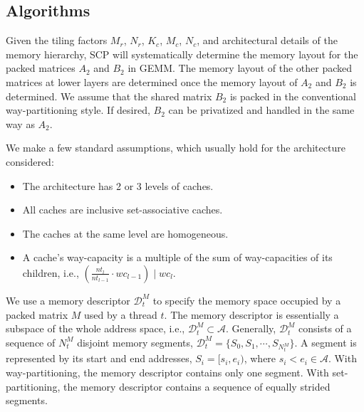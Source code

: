 \subsection{Algorithms}\label{subsec:formal}

Given the tiling factors $M_r$, $N_r$, $K_c$, $M_c$, $N_c$,
and architectural details of the memory hierarchy,
SCP will systematically determine 
the memory layout for the packed matrices $A_2$ and $B_2$ in GEMM.
The memory layout of the other packed matrices at
lower layers are determined once the memory layout of
$A_2$ and $B_2$ is determined.
We assume that the shared matrix $B_2$ is packed
in the conventional way-partitioning style.
If desired, $B_2$ can be privatized and handled in the same way as $A_2$.

We make a few standard assumptions, which usually
hold for the architecture considered:
\begin{itemize}
\item The architecture has 2 or 3 levels of caches. %
\item All caches are inclusive set-associative caches. %
\item The caches at the same level are homogeneous. %
\item A cache's way-capacity is a multiple of the sum of way-capacities of its children,
i.e., $(\frac{nt_l}{nt_{l-1}} \cdot wc_{l-1}) \mid wc_l$.
\end{itemize}

We use a memory descriptor $\mathcal{D}_t^M$ to specify 
the memory space occupied by a 
packed matrix $M$ used by a thread $t$.
The memory descriptor is essentially a subspace of
the whole address space, i.e., $\mathcal{D}_t^M \subset \mathcal{A}$.
Generally, $\mathcal{D}_t^M$ consists of a sequence of $N_t^M$ disjoint memory segments,
$\mathcal{D}_t^M = \{ S_0, S_1, \cdots, S_{N_t^M}\}$.
A segment is represented by its start and end addresses, $S_i = [s_i, e_i)$,
where $s_i < e_i \in \mathcal{A}$.
With way-partitioning, the memory descriptor contains only one segment.
With set-partitioning,
the memory descriptor contains a sequence of equally strided segments.

